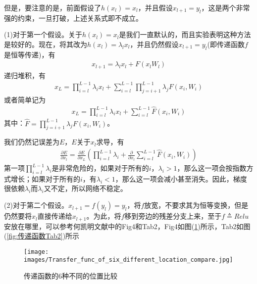             \par
            但是，要注意的是，前面假设了$h(x_l) = x_l$，并且假设$x_{l+1} =y_l$，这是两个非常强的约束，一旦打破，上述关系式即不成立。
            \par
            (1)对于第一个假设。关于$h(x_l) = x_l$是我们一直默认的，而且实验表明这种方法是较好的。现在，将其改为$h(x_l) = \lambda_l x_l$，并且仍然假设$x_{l+1} = y_l$(即传递函数$f$是恒等传递)，有
            \begin{align*}
            x_{l+1} = \lambda_l x_l + F(x_l W_l)
            \end{align*}
            递归堆积，有
            \begin{align*}
            x_L = \prod_{i=l}^{L-1} \lambda_i x_l + \sum_{i=l}^{L-1}\prod_{j=i+1}^{L-1}\lambda_jF(x_i,W_i)
            \end{align*}
            或者简单记为
            \begin{align*}
            x_L = \prod_{i=l}^{L-1} \lambda_i x_l + \sum_{i=l}^{L-1}\hat{F}(x_i,W_i)
            \end{align*}
            其中：$\hat{F} = \prod\limits_{j=i+1}^{L-1}\lambda_jF(x_i,W_i)$。
            \par
            我们仍然记误差为$E$，$E$关于$x_l$求导，有
            \begin{align*}
            \frac{\partial E}{\partial x_l} = \frac{\partial E}{\partial x_L} \left( \prod_{i=l}^{L-1}\lambda_i + \frac{\partial }{\partial x_l} \sum_{i=l}^{L-1}\hat{F}(x_i,W_i) \right)
            \end{align*}
            第一项$\prod\limits_{i=l}^{L-1}\lambda_i $是非常危险的，如果对于所有的$i$，$\lambda_i >1$，那么这一项会按指数方式增长；如果对于所有的$i$，有$\lambda_i < 1$，那么这一项会减小甚至消失。因此，梯度很依赖$\lambda_i$而$\lambda_i$又不定，所以网络不稳定。
            \par
            (2)对于第二个假设。$x_{l+1} = f(y_l) = y_l$，将$f$放宽，不要求其为恒等变换，但是仍然要将$x_l$直接传递给$x_{l+1}$。为此，将$f$移到旁边的残差分支上来，至于$f\triangleq Relu$安放在哪里，可以参考何凯明文献\cite{2016.Kaiming}中的Fig4和Tab2，Fig4如图(\ref{fig:传递函数的6种不同的位置比较})所示，Tab2如图(\ref{fig:传递函数Tab2})所示
            \begin{figure}[H]
            \centering
            \texttt{[image: images/Transfer\_func\_of\_six\_different\_location\_compare.jpg]}
            \caption{传递函数的6种不同的位置比较}
            \label{fig:传递函数的6种不同的位置比较}
            \end{figure}
